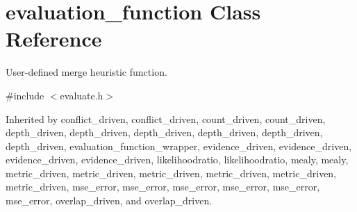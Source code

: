 \hypertarget{classevaluation__function}{}\section{evaluation\+\_\+function Class Reference}
\label{classevaluation__function}


User-\/defined merge heuristic function.  




{\ttfamily \#include $<$evaluate.\+h$>$}



Inherited by conflict\+\_\+driven, conflict\+\_\+driven, count\+\_\+driven, count\+\_\+driven, depth\+\_\+driven, depth\+\_\+driven, depth\+\_\+driven, depth\+\_\+driven, depth\+\_\+driven, depth\+\_\+driven, evaluation\+\_\+function\+\_\+wrapper, evidence\+\_\+driven, evidence\+\_\+driven, evidence\+\_\+driven, evidence\+\_\+driven, likelihoodratio, likelihoodratio, mealy, mealy, metric\+\_\+driven, metric\+\_\+driven, metric\+\_\+driven, metric\+\_\+driven, metric\+\_\+driven, metric\+\_\+driven, mse\+\_\+error, mse\+\_\+error, mse\+\_\+error, mse\+\_\+error, mse\+\_\+error, mse\+\_\+error, overlap\+\_\+driven, and overlap\+\_\+driven.

